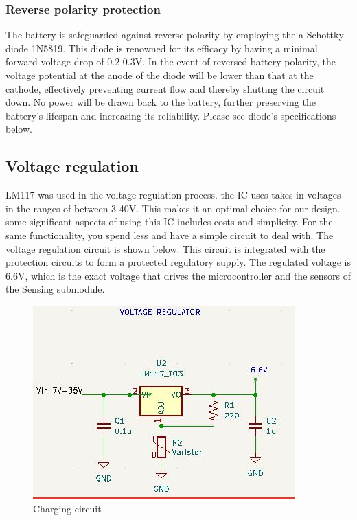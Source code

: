 \documentclass[class=report,11pt,crop=false]{standalone}
\begin{document}
	\subsubsection{Reverse polarity protection}
	\vspace{0.5cm}
	
	The battery is safeguarded against reverse polarity by employing the a Schottky diode 1N5819. This diode is renowned for its efficacy by having a minimal forward voltage drop of 0.2-0.3V. In the event of reversed battery polarity, the voltage potential at the anode of the diode will be lower than that at the cathode, effectively preventing current flow and thereby shutting the circuit down. No power will be drawn back to the battery, further preserving the battery's lifespan and increasing its reliability. Please see diode's specifications below.
	
	
	\subsection{Voltage regulation}
	LM117 was used in the voltage regulation process. the IC uses takes in voltages in the ranges of between 3-40V. This makes it an optimal choice for our design. some significant aspects of using this IC includes costs and simplicity. For the same functionality, you spend less and have a simple circuit to deal with. The voltage regulation circuit is shown below. This circuit is integrated with the protection circuits to form a protected regulatory supply. The regulated voltage is 6.6V, which is the exact voltage that drives the microcontroller and the sensors of the Sensing submodule.  
	
	\begin{figure}[h!]
		\centering
		\includegraphics[width=0.9\linewidth]{Figures/regulator.jpg}
		\caption{Charging circuit}
		\label{fig: P1}
	\end{figure}
	
\end{document}
